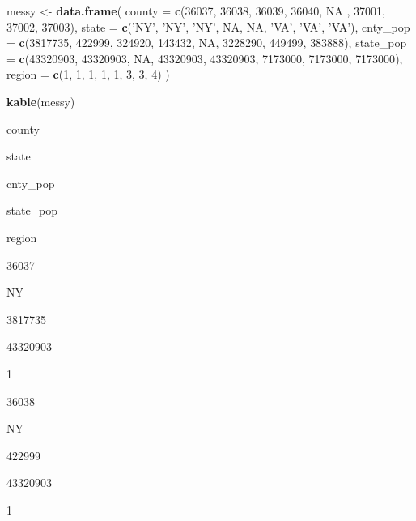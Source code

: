\documentclass[]{book}
\newenvironment{Shaded}{\begin{snugshade}}{\end{snugshade}}
\newcommand{\DataTypeTok}[1]{\textcolor[rgb]{0.13,0.29,0.53}{#1}}
\newcommand{\DecValTok}[1]{\textcolor[rgb]{0.00,0.00,0.81}{#1}}
\newcommand{\KeywordTok}[1]{\textcolor[rgb]{0.13,0.29,0.53}{\textbf{#1}}}
\newcommand{\NormalTok}[1]{#1}
\newcommand{\OtherTok}[1]{\textcolor[rgb]{0.56,0.35,0.01}{#1}}
\newcommand{\StringTok}[1]{\textcolor[rgb]{0.31,0.60,0.02}{#1}}
\begin{document}
\begin{Shaded}
\begin{Highlighting}[]
\NormalTok{messy <-}\StringTok{ }\KeywordTok{data.frame}\NormalTok{(}
  \DataTypeTok{county =} \KeywordTok{c}\NormalTok{(}\DecValTok{36037}\NormalTok{, }\DecValTok{36038}\NormalTok{, }\DecValTok{36039}\NormalTok{, }\DecValTok{36040}\NormalTok{, }\OtherTok{NA}\NormalTok{ , }\DecValTok{37001}\NormalTok{, }\DecValTok{37002}\NormalTok{, }\DecValTok{37003}\NormalTok{),}
  \DataTypeTok{state =} \KeywordTok{c}\NormalTok{(}\StringTok{'NY'}\NormalTok{, }\StringTok{'NY'}\NormalTok{, }\StringTok{'NY'}\NormalTok{, }\OtherTok{NA}\NormalTok{, }\OtherTok{NA}\NormalTok{, }\StringTok{'VA'}\NormalTok{, }\StringTok{'VA'}\NormalTok{, }\StringTok{'VA'}\NormalTok{),}
  \DataTypeTok{cnty_pop =} \KeywordTok{c}\NormalTok{(}\DecValTok{3817735}\NormalTok{, }\DecValTok{422999}\NormalTok{, }\DecValTok{324920}\NormalTok{, }\DecValTok{143432}\NormalTok{, }\OtherTok{NA}\NormalTok{, }\DecValTok{3228290}\NormalTok{, }\DecValTok{449499}\NormalTok{, }\DecValTok{383888}\NormalTok{),}
  \DataTypeTok{state_pop =} \KeywordTok{c}\NormalTok{(}\DecValTok{43320903}\NormalTok{, }\DecValTok{43320903}\NormalTok{, }\OtherTok{NA}\NormalTok{, }\DecValTok{43320903}\NormalTok{, }\DecValTok{43320903}\NormalTok{, }\DecValTok{7173000}\NormalTok{, }\DecValTok{7173000}\NormalTok{, }\DecValTok{7173000}\NormalTok{),}
  \DataTypeTok{region =} \KeywordTok{c}\NormalTok{(}\DecValTok{1}\NormalTok{, }\DecValTok{1}\NormalTok{, }\DecValTok{1}\NormalTok{, }\DecValTok{1}\NormalTok{, }\DecValTok{1}\NormalTok{, }\DecValTok{3}\NormalTok{, }\DecValTok{3}\NormalTok{, }\DecValTok{4}\NormalTok{)}
\NormalTok{)}

\KeywordTok{kable}\NormalTok{(messy)}
\end{Highlighting}
\end{Shaded}

county

state

cnty\_pop

state\_pop

region

36037

NY

3817735

43320903

1

36038

NY

422999

43320903

1
\end{document}
